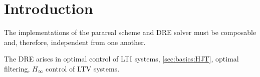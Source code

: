 \chapter{Introduction}

The implementations of the parareal scheme and \ac{DRE} solver must be composable and,
therefore, independent from one another.

The \ac{DRE} arises in \eg optimal control of \ac{LTI} systems, \cf \autoref{sec:basics:HJT},
optimal filtering, $H_\infty$ control of \ac{LTV} systems.
